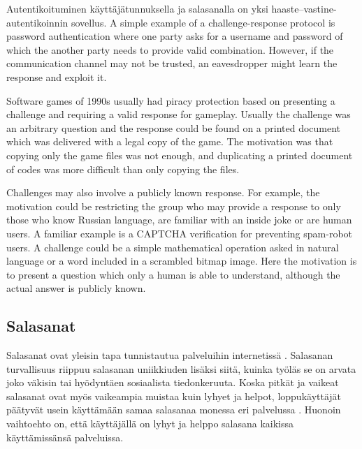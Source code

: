 \documentclass[english,gradu]{tktltiki}
\begin{document}
Autentikoituminen käyttäjätunnuksella ja salasanalla on yksi haaste--vastine-autentikoinnin sovellus.
A simple example of a challenge-response protocol is password authentication where one party asks for a username and password of which the another party needs to provide valid combination. However, if the communication channel may not be trusted, an eavesdropper might learn the response and exploit it.

Software games of 1990s usually had piracy protection based on presenting a challenge and requiring a valid response for gameplay. Usually the challenge was an arbitrary question and the response could be found on a printed document which was delivered with a legal copy of the game. The motivation was that copying only the game files was not enough, and duplicating a printed document of codes was more difficult than only copying the files.

Challenges may also involve a publicly known response. For example, the motivation could be restricting the group who may provide a response to only those who know Russian language, are familiar with an inside joke or are human users. A familiar example is a CAPTCHA verification for preventing spam-robot users. A challenge could be a simple mathematical operation asked in natural language or a word included in a scrambled bitmap image. Here the motivation is to present a question which only a human is able to understand, although the actual answer is publicly known.



\subsection{Salasanat} %
\label{sub:salasanat}



 \label{sec:passwords}

Salasanat ovat yleisin tapa tunnistautua palveluihin internetissä \cite{study_of_passwords_07, passpet_06, password_management_strategies_06, pwdhash_extension_05}.
Salasanan turvallisuus riippuu salasanan uniikkiuden lisäksi siitä, kuinka työläs se on arvata joko väkisin tai hyödyntäen sosiaalista tiedonkeruuta. Koska pitkät ja vaikeat salasanat ovat myös vaikeampia muistaa kuin lyhyet ja helpot, loppukäyttäjät päätyvät usein käyttämään samaa salasanaa monessa eri palvelussa \cite{study_of_passwords_07}. Huonoin vaihtoehto on, että käyttäjällä on lyhyt ja helppo salasana kaikissa käyttämissänsä palveluissa.
\end{document}
